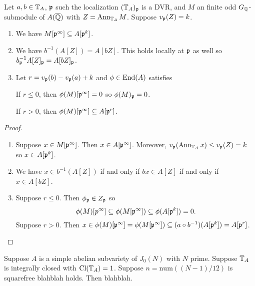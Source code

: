 \documentclass[thesis.tex]{subfiles}
\begin{document}
\begin{lemma}
    Let $a,b\in \mathbb{T}_A$, $\mathfrak{p}$ such the localization $(\mathbb{T}_A)_{\mathfrak{p}}$ is a DVR, and
    $M$ an finite odd $G_{\mathbb{Q}}$-submodule of $A(\overline{\mathbb{Q}})$ with $Z=\operatorname{Ann}_{\mathbb{T}_A} M$.
    Suppose $v_{\mathfrak{p}}(Z)=k$.
    \begin{enumerate}
        \item
            We have $M[\mathfrak{p}^\infty]\subseteq A[\mathfrak{p}^k]$.
        \item
            We have $b^{-1}(A[Z])=A[bZ]$. This holds locally at $\mathfrak{p}$ as well so
            $b_{\mathfrak{p}} ^{-1} A[Z]_{\mathfrak{p}} = A[bZ]_{\mathfrak{p}}$.
        \item
            Let $r=v_{\mathfrak{p}}(b)-v_{\mathfrak{p}}(a)+k$ and $\phi\in \operatorname{End}(A)$ satisfies
            
            If $r\leq
            0$, then $\phi(M)[\mathfrak{p}^\infty]=0$ so $\phi(M)_{\mathfrak{p}}=0$.

            If $r>0$, then $\phi(M)[\mathfrak{p}^\infty]\subseteq A[\mathfrak{p}^r]$.
    \end{enumerate}
\end{lemma}
\begin{proof}
    \mbox{}
    \begin{enumerate}
        \item
            Suppose $x\in M[\mathfrak{p}^\infty]$. Then $x\in A[\mathfrak{p}^\infty]$. Moreover,
            $v_{\mathfrak{p}}(\operatorname{Ann}_{\mathbb{T}_A} x) \leq v_{\mathfrak{p}}(Z) = k$ so $x\in A[\mathfrak{p}^k]$.
        \item
            We have $x\in b^{-1}(A[Z])$ if and only if $bx \in A[Z]$ if and
            only if $x\in A[bZ]$.
        \item
            Suppose $r\leq 0$. Then $\phi_{\mathfrak{p}} \in Z_{\mathfrak{p}}$ so
            \[
                \phi(M)[p^\infty]\subseteq \phi(M[\mathfrak{p}^\infty])
                \subseteq \phi(A[\mathfrak{p}^k]) = 0.
            \]
            Suppose $r>0$. Then $x\in \phi(M)[\mathfrak{p}^\infty] =
            \phi(M[\mathfrak{p}^\infty])\subseteq (a\circ
            b^{-1})(A[\mathfrak{p}^k])=A[\mathfrak{p}^r]$.
    \end{enumerate}
\end{proof}


\begin{corollary}
    Suppose $A$ is a simple abelian subvariety of $J_0(N)$ with $N$ prime.
    Suppose $\mathbb{T}_A$ is integrally closed with $\operatorname{Cl}(\mathbb{T}_A) = 1$. Suppose
    $n=\mathrm{num}((N-1)/12)$ is squarefree blahblah holds. Then
    blahblah.
\end{corollary}
\end{document}
